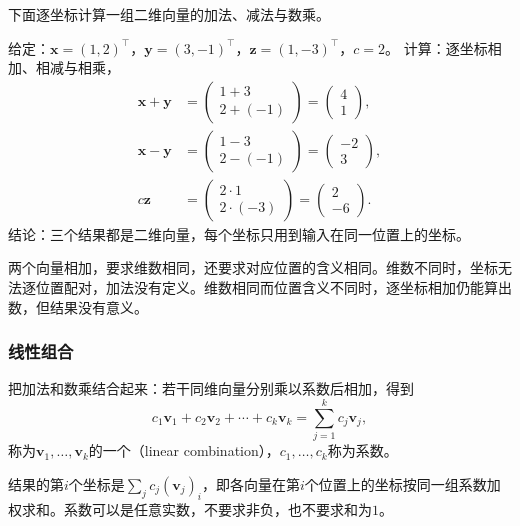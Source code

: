 下面逐坐标计算一组二维向量的加法、减法与数乘。
\begin{example}
\label{ex:ls-vector-addition-scaling}
给定：$\bm x=(1,2)^\top$，$\bm y=(3,-1)^\top$，$\bm z=(1,-3)^\top$，$c=2$。
计算：逐坐标相加、相减与相乘，
\[
 \begin{aligned}
 \bm x+\bm y&=\begin{pmatrix}1+3\\2+(-1)\end{pmatrix}=\begin{pmatrix}4\\1\end{pmatrix},\\
 \bm x-\bm y&=\begin{pmatrix}1-3\\2-(-1)\end{pmatrix}=\begin{pmatrix}-2\\3\end{pmatrix},\\
 c\bm z&=\begin{pmatrix}2\cdot1\\2\cdot(-3)\end{pmatrix}=\begin{pmatrix}2\\-6\end{pmatrix}.
 \end{aligned}
\]
结论：三个结果都是二维向量，每个坐标只用到输入在同一位置上的坐标。
\end{example}

两个向量相加，要求维数相同，还要求对应位置的含义相同。维数不同时，坐标无法逐位置配对，加法没有定义。维数相同而位置含义不同时，逐坐标相加仍能算出数，但结果没有意义。

\subsubsection{线性组合}

把加法和数乘结合起来：若干同维向量分别乘以系数后相加，得到
\[
 c_1\bm v_1+c_2\bm v_2+\cdots+c_k\bm v_k=\sum_{j=1}^k c_j\bm v_j,
\]
称为$\bm v_1,\ldots,\bm v_k$的一个（linear combination），$c_1,\ldots,c_k$称为系数。

结果的第$i$个坐标是$\sum_jc_j(\bm v_j)_i$，即各向量在第$i$个位置上的坐标按同一组系数加权求和。系数可以是任意实数，不要求非负，也不要求和为$1$。

